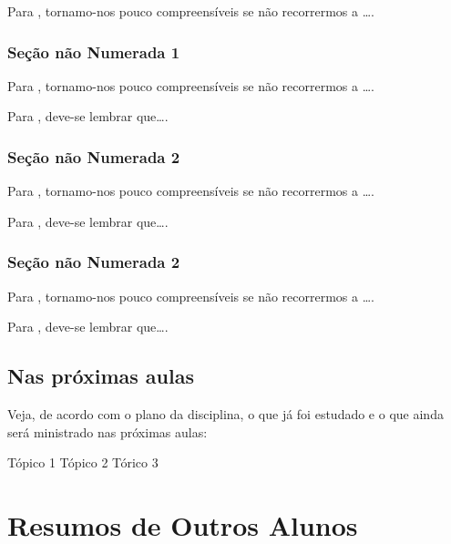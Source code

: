 \documentclass[
]{book}
\begin{document}
Para \citet{BOCK2001}, tornamo-nos pouco compreensíveis se não recorrermos a \ldots.

\hypertarget{seuxe7uxe3o-nuxe3o-numerada-1-7}{%
\subsection*{Seção não Numerada 1}\label{seuxe7uxe3o-nuxe3o-numerada-1-7}}

Para \citet{BOCK2001}, tornamo-nos pouco compreensíveis se não recorrermos a \ldots.

Para \citet{DAVIDOFF2001}, deve-se lembrar que\ldots.

\hypertarget{seuxe7uxe3o-nuxe3o-numerada-2-10}{%
\subsection*{Seção não Numerada 2}\label{seuxe7uxe3o-nuxe3o-numerada-2-10}}

Para \citet{BOCK2001}, tornamo-nos pouco compreensíveis se não recorrermos a \ldots.

Para \citet{DAVIDOFF2001}, deve-se lembrar que\ldots.

\hypertarget{seuxe7uxe3o-nuxe3o-numerada-2-11}{%
\subsection*{Seção não Numerada 2}\label{seuxe7uxe3o-nuxe3o-numerada-2-11}}

Para \citet{BOCK2001}, tornamo-nos pouco compreensíveis se não recorrermos a \ldots.

Para \citet{DAVIDOFF2001}, deve-se lembrar que\ldots.

\hypertarget{nas-pruxf3ximas-aulas-1}{%
\section{Nas próximas aulas}\label{nas-pruxf3ximas-aulas-1}}

Veja, de acordo com o plano da disciplina, o que já foi estudado e o que ainda será ministrado nas próximas aulas:

Tópico 1
Tópico 2
Tórico 3

\hypertarget{resumos-de-outros-alunos}{%
\chapter{Resumos de Outros Alunos}\label{resumos-de-outros-alunos}}
\end{document}
